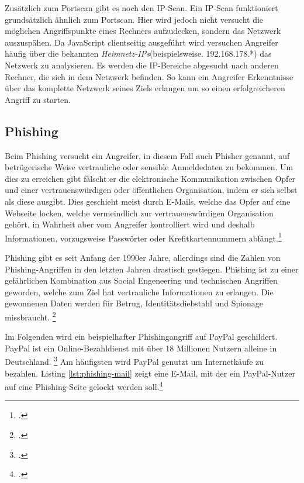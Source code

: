 Zusätzlich zum Portscan gibt es noch den IP-Scan. Ein IP-Scan funktioniert grundsätzlich ähnlich zum Portscan. Hier wird jedoch nicht versucht die möglichen Angriffspunkte eines Rechners aufzudecken, sondern das Netzwerk auszuspähen. Da JavaScript clientseitig ausgeführt wird versuchen Angreifer häufig über die bekannten \textit{Heimnetz-IPs}(beispielsweise. 192.168.178.*) das Netzwerk zu analysieren. Es werden die IP-Bereiche abgesucht nach anderen Rechner, die sich in dem Netzwerk befinden. So kann ein Angreifer Erkenntnisse über das komplette Netzwerk seines Ziels erlangen um so einen erfolgreicheren Angriff zu starten.

\subsection{Phishing}

Beim Phishing versucht ein Angreifer, in diesem Fall auch Phisher genannt, auf betrügerische Weise vertrauliche oder sensible Anmeldedaten zu bekommen. Um dies zu erreichen gibt fälscht er die elektronische Kommunikation zwischen Opfer und einer vertrauenswürdigen oder öffentlichen Organisation, indem er sich selbst als diese ausgibt. Dies geschieht meist durch E-Mails, welche das Opfer auf eine Webseite locken, welche vermeindlich zur vertrauenswürdigen Organisation gehört, in Wahrheit aber vom Angreifer kontrolliert wird und deshalb Informationen, vorzugsweise Passwörter oder Krefitkartennummern abfängt.\footcite[Vgl.][1]{phishing}

Phishing gibt es seit Anfang der 1990er Jahre, allerdings sind die Zahlen von Phishing-Angriffen in den letzten Jahren drastisch gestiegen. Phishing ist zu einer gefährlichen Kombination aus Social Engeneering und technischen Angriffen geworden, welche zum Ziel hat vertrauliche Informationen zu erlangen. Die gewonnenen Daten werden für Betrug, Identitätsdiebstahl und Spionage missbraucht. \footcite[Vgl.][1\psq]{phishing}

Im Folgenden wird ein beispielhafter Phishingangriff auf PayPal geschildert. PayPal ist ein Online-Bezahldienst mit über 18 Millionen Nutzern alleine in Deutschland. \footcite[Vgl.][]{paypal} Am häufigsten wird PayPal genutzt um Internetkäufe zu bezahlen. Listing \ref{lst:phishing-mail} zeigt eine E-Mail, mit der ein PayPal-Nutzer auf eine Phishing-Seite gelockt werden soll.\footcite[Vgl.][10]{phishing}

